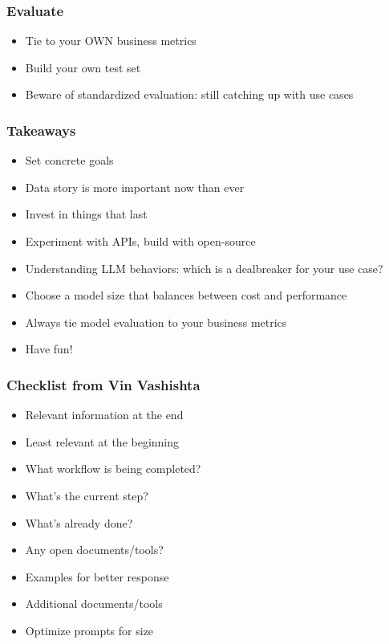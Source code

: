 \begin{frame}[fragile]\frametitle{Evaluate}

\begin{itemize}
\item Tie to your OWN business metrics
\item Build your own test set
\item Beware of standardized evaluation: still catching up with use cases
\end{itemize}	

\end{frame}

\begin{frame}[fragile]\frametitle{Takeaways}

\begin{itemize}
\item Set concrete goals
\item Data story is more important now than ever
\item Invest in things that last
\item Experiment with APIs, build with open-source
\item Understanding LLM behaviors: which is a dealbreaker for your use case?
\item Choose a model size that balances between cost and performance
\item Always tie model evaluation to your business metrics
\item Have fun!
\end{itemize}	

\end{frame}


\begin{frame}[fragile]\frametitle{Checklist from Vin Vashishta}

\begin{itemize}
\item Relevant information at the end
\item Least relevant at the beginning
\item What workflow is being completed?
\item What's the current step?
\item What's already done?
\item Any open documents/tools?
\item Examples for better response
\item Additional documents/tools
\item Optimize prompts for size
\end{itemize}	

\end{frame}


